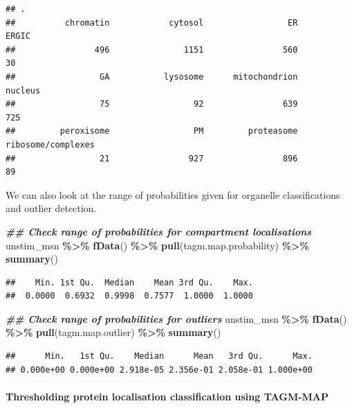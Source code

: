 \documentclass[9pt,a4paper,]{extarticle}
\newenvironment{Shaded}{\begin{snugshade}}{\end{snugshade}}
\newcommand{\DocumentationTok}[1]{\textcolor[rgb]{0.56,0.35,0.01}{\textbf{\textit{#1}}}}
\newcommand{\FunctionTok}[1]{\textcolor[rgb]{0.13,0.29,0.53}{\textbf{#1}}}
\newcommand{\NormalTok}[1]{#1}
\newcommand{\SpecialCharTok}[1]{\textcolor[rgb]{0.81,0.36,0.00}{\textbf{#1}}}
\begin{document}
\begin{verbatim}
## .
##          chromatin            cytosol                 ER              ERGIC 
##                496               1151                560                 30 
##                 GA           lysosome      mitochondrion            nucleus 
##                 75                 92                639                725 
##         peroxisome                 PM         proteasome ribosome/complexes 
##                 21                927                896                 89
\end{verbatim}

We can also look at the range of probabilities given for organelle
classifications and outlier detection.

\begin{Shaded}
\begin{Highlighting}[]
\DocumentationTok{\#\# Check range of probabilities for compartment localisations}
\NormalTok{unstim\_msn }\SpecialCharTok{\%\textgreater{}\%}
  \FunctionTok{fData}\NormalTok{() }\SpecialCharTok{\%\textgreater{}\%}
  \FunctionTok{pull}\NormalTok{(tagm.map.probability) }\SpecialCharTok{\%\textgreater{}\%}
  \FunctionTok{summary}\NormalTok{()}
\end{Highlighting}
\end{Shaded}

\begin{verbatim}
##    Min. 1st Qu.  Median    Mean 3rd Qu.    Max. 
##  0.0000  0.6932  0.9998  0.7577  1.0000  1.0000
\end{verbatim}

\begin{Shaded}
\begin{Highlighting}[]
\DocumentationTok{\#\# Check range of probabilities for outliers}
\NormalTok{unstim\_msn }\SpecialCharTok{\%\textgreater{}\%}
  \FunctionTok{fData}\NormalTok{() }\SpecialCharTok{\%\textgreater{}\%}
  \FunctionTok{pull}\NormalTok{(tagm.map.outlier) }\SpecialCharTok{\%\textgreater{}\%}
  \FunctionTok{summary}\NormalTok{()}
\end{Highlighting}
\end{Shaded}

\begin{verbatim}
##      Min.   1st Qu.    Median      Mean   3rd Qu.      Max. 
## 0.000e+00 0.000e+00 2.918e-05 2.356e-01 2.058e-01 1.000e+00
\end{verbatim}

\paragraph{Thresholding protein localisation classification using TAGM-MAP}\label{thresholding-protein-localisation-classification-using-tagm-map}
\end{document}
